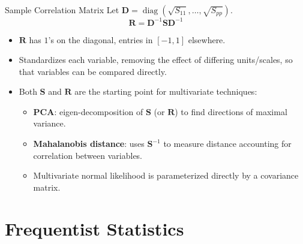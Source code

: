 \documentclass[11pt,aspectratio=169]{beamer}
\begin{document}
\begin{frame}{Sample Correlation Matrix}
Let $\mathbf D=\operatorname{diag}(\sqrt{S_{11}},\dots,\sqrt{S_{pp}})$.
\[
    \mathbf R = \mathbf D^{-1}\mathbf S\mathbf D^{-1}
\]
\begin{itemize}
    \item $\mathbf R$ has $1$'s on the diagonal, entries in $[-1,1]$
          elsewhere.
    \item Standardizes each variable, removing the effect of differing
          units/scales, so that variables can be compared directly.
    \item Both $\mathbf S$ and $\mathbf R$ are the starting point for
          multivariate techniques:
    \begin{itemize}
        \item \textbf{PCA}: eigen-decomposition of $\mathbf S$ (or
              $\mathbf R$) to find directions of maximal variance.
        \item \textbf{Mahalanobis distance}: uses $\mathbf S^{-1}$ to
              measure distance accounting for correlation between
              variables.
        \item Multivariate normal likelihood is parameterized directly by
              a covariance matrix.
    \end{itemize}
\end{itemize}
\end{frame}

\section{Frequentist Statistics}
\end{document}
